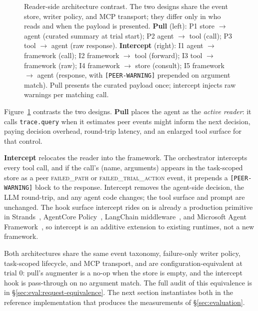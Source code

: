 \begin{figure}[t]
\centering

\caption{Reader-side architecture contrast. The two designs share
the event store, writer policy, and MCP transport; they differ
only in who reads and when the payload is presented.
\textbf{Pull} (left): P1 store $\to$ agent (curated summary at
trial start); P2 agent $\to$ tool (call); P3 tool $\to$ agent
(raw response).
\textbf{Intercept} (right): I1 agent $\to$ framework (call); I2
framework $\to$ tool (forward); I3 tool $\to$ framework (raw);
I4 framework $\to$ store (consult); I5 framework $\to$ agent
(response, with \texttt{[PEER-WARNING]} prepended on argument
match).  Pull presents the curated payload once; intercept
injects raw warnings per matching call.}
\label{fig:pull-vs-intercept}
\end{figure}

Figure~\ref{fig:pull-vs-intercept} contrasts the two designs.
\textbf{Pull} places the agent as the \emph{active reader}: it
calls \texttt{trace.query} when it estimates peer events might
inform the next decision, paying decision overhead, round-trip
latency, and an enlarged tool surface for that control.

\textbf{Intercept} relocates the reader into the framework. The
orchestrator intercepts every tool call, and if the call's
(name, arguments) appears in the task-scoped store as a peer
\textsc{failed\_path} or \textsc{failed\_trial\_action} event,
it prepends a \texttt{[PEER-WARNING]} block to the response.
Intercept removes the agent-side decision, the LLM round-trip,
and any agent code changes; the tool surface and prompt are
unchanged. The hook surface intercept rides on is already a
production primitive in Strands~\cite{strandshooks2025},
AgentCore Policy~\cite{agentcorepolicy2025}, LangChain
middleware~\cite{langchainmiddleware2026}, and Microsoft Agent
Framework~\cite{msagentframework2026}, so intercept is an
additive extension to existing runtimes, not a new framework.

Both architectures share the same event taxonomy, failure-only
writer policy, task-scoped lifecycle, and MCP transport, and are
configuration-equivalent at trial 0: pull's augmenter is a no-op
when the store is empty, and the intercept hook is pass-through
on no argument match. The full audit of this equivalence is in
\S\ref{sec:eval:request-equivalence}. The next
section instantiates both in the reference implementation that
produces the measurements of \S\ref{sec:evaluation}.
